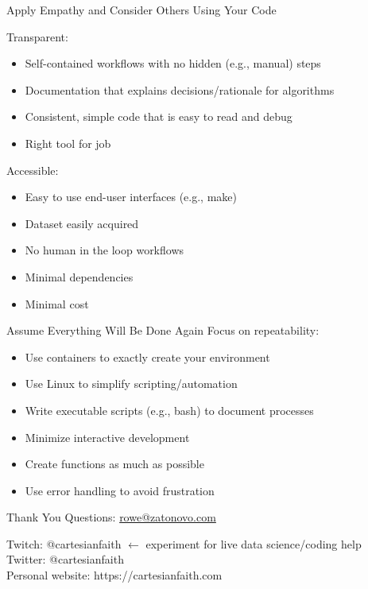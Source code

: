 \documentclass{beamer}
\begin{document}
\begin{frame}{Apply Empathy and Consider Others Using Your Code}

Transparent:

\begin{itemize}
\item Self-contained workflows with no hidden (e.g., manual) steps
\item Documentation that explains decisions/rationale for algorithms
\item Consistent, simple code that is easy to read and debug
\item Right tool for job
\end{itemize}

\pause
Accessible:

\begin{itemize}
\item Easy to use end-user interfaces (e.g., make)
\item Dataset easily acquired
\item No human in the loop workflows
\item Minimal dependencies
\item Minimal cost
\end{itemize}

\end{frame}




%
%
%
%





\begin{frame}{Assume Everything Will Be Done Again}
Focus on repeatability:

\begin{itemize}
\item Use containers to exactly create your environment
\item Use Linux to simplify scripting/automation
\item Write executable scripts (e.g., bash) to document processes
\item Minimize interactive development
\item Create functions as much as possible
\item Use error handling to avoid frustration
\end{itemize}

\end{frame}


\begin{frame}{Thank You}
Questions: \href{mailto:rowe@zatonovo.com}{rowe@zatonovo.com}

Twitch: @cartesianfaith $\leftarrow$ experiment for live data science/coding help\\
Twitter: @cartesianfaith\\
Personal website: https://cartesianfaith.com

\end{frame}

\appendix
\end{document}
